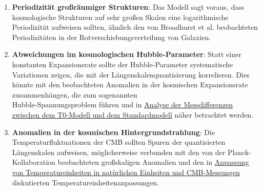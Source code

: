 \documentclass[12pt,a4paper]{article}
\begin{document}
	\begin{enumerate}
		\item \textbf{Periodizität großräumiger Strukturen}: Das Modell sagt voraus, dass kosmologische Strukturen auf sehr großen Skalen eine logarithmische Periodizität aufweisen sollten, ähnlich den von Broadhurst et al. \cite{broadhurst1990} beobachteten Periodizitäten in der Rotverschiebungsverteilung von Galaxien.
		
		\item \textbf{Abweichungen im kosmologischen Hubble-Parameter}: Statt einer konstanten Expansionsrate sollte der Hubble-Parameter systematische Variationen zeigen, die mit der Längen\-skalen\-quantisierung korrelieren. Dies könnte mit den beobachteten Anomalien in der kosmischen Expansionsrate zusammenhängen, die zum sogenannten\\ \glqq Hubble-Spannungsproblem\grqq{} \cite{riess2019} führen und in \href{https://github.com/jpascher/T0-Time-Mass-Duality/blob/main/2/pdf/Deutsch/MessdifferenzenT0Standard.pdf}{Analyse der Messdifferenzen zwischen dem T0-Modell und dem Standardmodell} \cite{pascher_messdifferenzen_2025} näher betrachtet werden.
		
		\item \textbf{Anomalien in der kosmischen Hintergrundstrahlung}: Die Temperaturfluktuationen der CMB sollten Spuren der quantisierten Längen\-skalen aufweisen, möglicherweise verbunden mit den von der Planck-Kollaboration \cite{planck2018} beobachteten großskaligen Anomalien und den in \href{https://github.com/jpascher/T0-Time-Mass-Duality/blob/main/2/pdf/Deutsch/TempEinheitenCMB.pdf}{Anpassung von Temperatureinheiten in natürlichen Einheiten und CMB-Messungen} \cite{pascher_temp_2025} diskutierten Temperatureinheitenanpassungen.
	\end{enumerate}
	
\end{document}
